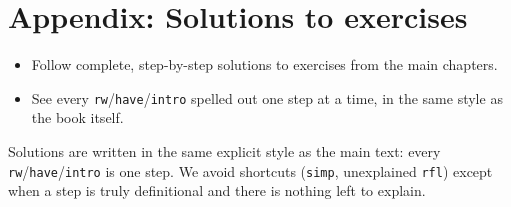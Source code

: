 \chapter*{Appendix: Solutions to exercises}
\setcounter{section}{0}\label{sec:14-appendix-solutions:00-index:1}

\begin{learningobjectives}
\begin{itemize}
\tightlist
\item
  Follow complete, step-by-step solutions to exercises from the main chapters.
\item
  See every \texttt{rw}/\texttt{have}/\texttt{intro} spelled out one step at a time, in the same style as the book itself.
\end{itemize}
\end{learningobjectives}


Solutions are written in the same explicit style as the main text: every \texttt{rw}/\texttt{have}/\texttt{intro} is one step. We avoid shortcuts (\texttt{simp}, unexplained \texttt{rfl}) except when a step is truly definitional and there is nothing left to explain.












